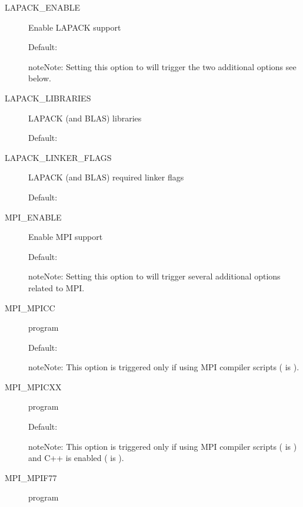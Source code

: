 \documentclass[letterpaper,10pt,english]{sphinxmanual}
\begin{document}
\begin{description}
\item[{LAPACK\_ENABLE}] \leavevmode
Enable LAPACK support

Default: 

\begin{notice}{note}{Note:}
Setting this option to  will trigger the two additional
options see below.
\end{notice}

\item[{LAPACK\_LIBRARIES}] \leavevmode
LAPACK (and BLAS) libraries

Default: 

\item[{LAPACK\_LINKER\_FLAGS}] \leavevmode
LAPACK (and BLAS) required linker flags

Default: 

\item[{MPI\_ENABLE}] \leavevmode
Enable MPI support

Default: 

\begin{notice}{note}{Note:}
Setting this option to  will trigger several additional
options related to MPI.
\end{notice}

\item[{MPI\_MPICC}] \leavevmode
{} program

Default: 

\begin{notice}{note}{Note:}
This option is triggered only if using MPI compiler scripts
( is ).
\end{notice}

\item[{MPI\_MPICXX}] \leavevmode
{} program

Default:

\begin{notice}{note}{Note:}
This option is triggered only if using MPI compiler scripts
( is ) and C++ is enabled
( is ).
\end{notice}

\item[{MPI\_MPIF77}] \leavevmode
{} program


\end{description}
\end{document}
